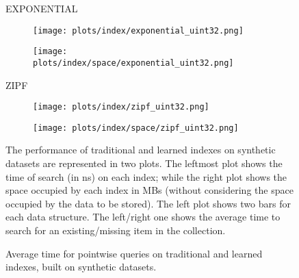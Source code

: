 \documentclass{article}
\begin{document}
\begin{figure}[!htbp]
{\begin{minipage}[t][0.98\textheight][t]{\textwidth}
    \begin{minipage}{0.05\linewidth}
    \begin{sideways}\small EXPONENTIAL\end{sideways}
    \end{minipage}
    \begin{minipage}{0.32\linewidth}
        \begin{figure}[H]
        \texttt{[image: plots/index/exponential\_uint32.png]}
        \end{figure}
    \end{minipage}
    \begin{minipage}{0.32\linewidth}
        \begin{figure}[H]
            \texttt{[image: plots/index/space/exponential\_uint32.png]}
        \end{figure}
    \end{minipage}
    \vspace*{-16px}

    \begin{minipage}{0.05\linewidth}
    \begin{sideways}\small ZIPF\end{sideways}
    \end{minipage}
    \begin{minipage}{0.32\linewidth}
        \begin{figure}[H]
        \texttt{[image: plots/index/zipf\_uint32.png]}
        \end{figure}
    \end{minipage}
    \begin{minipage}{0.32\linewidth}
        \begin{figure}[H]
            \texttt{[image: plots/index/space/zipf\_uint32.png]}
        \end{figure}
    \end{minipage}
    \vfill
    
    \centering
    \begin{minipage}{\linewidth}
        The performance of traditional and learned indexes on synthetic datasets are represented in two plots. The leftmost plot shows the time of search (in ns) on each index; while the right plot shows the space occupied by each index in MBs (without considering the space occupied by the data to be stored). The left plot shows two bars for each data structure. The left/right one shows the average time to search for an existing/missing item in the collection.
    \end{minipage}
    \vspace{10px}
\end{minipage}
}
\caption{Average time for pointwise queries on traditional and learned indexes, built on synthetic datasets.}
\end{figure}
\end{document}
